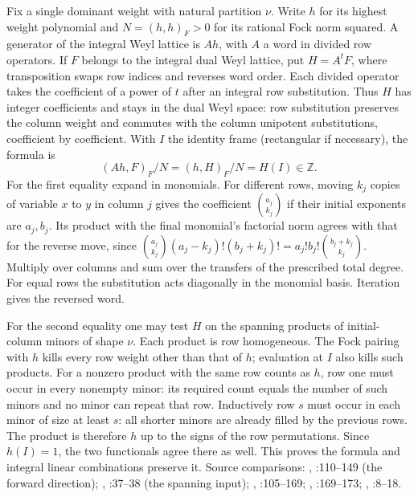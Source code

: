 Fix a single dominant weight with natural partition $\nu$. Write $h$ for its
highest weight polynomial and $N=(h,h)_F>0$ for its rational Fock norm
squared. A generator of the integral Weyl lattice is $Ah$, with $A$ a word
in divided row operators. If $F$ belongs to the integral dual Weyl lattice,
put $H=A^t F$, where transposition swaps row indices and reverses word order.
Each divided operator takes the coefficient of a power of $t$ after an
integral row substitution. Thus $H$ has integer coefficients and stays
in the dual Weyl space: row substitution preserves the column weight and
commutes with the column unipotent substitutions, coefficient by coefficient.
With $I$ the identity frame (rectangular if necessary), the formula is
\[
             (Ah,F)_F/N=(h,H)_F/N=H(I)\in\mathbb Z.
\]
For the first equality expand in monomials. For different rows, moving
$k_j$ copies of variable $x$ to $y$ in column $j$ gives the coefficient
$\binom{a_j}{k_j}$ if their initial exponents are $a_j,b_j$.
Its product with the final monomial's factorial norm agrees with that
for the reverse move, since
$\binom{a_j}{k_j}(a_j-k_j)!(b_j+k_j)!
= a_j!b_j!\binom{b_j+k_j}{k_j}$.
Multiply over columns and sum over the transfers of the prescribed total
degree. For equal rows the substitution acts diagonally in the monomial
basis. Iteration gives the reversed word.

For the second equality one may test $H$ on the spanning products of
initial-column minors of shape $\nu$. Each product is row homogeneous.
The Fock pairing with $h$ kills every row weight other than that of $h$;
evaluation at $I$ also kills such products. For a nonzero product with
the same row counts as $h$, row one must occur in every nonempty minor:
its required count equals the number of such minors and no minor can
repeat that row. Inductively row $s$ must occur in each minor of size
at least $s$: all shorter minors are already filled by the previous rows.
The product is therefore $h$ up to the signs of the row permutations.
Since $h(I)=1$, the two functionals agree there as well. This proves
the formula and integral linear combinations preserve it.
Source comparisons: ,
:110--149 (the forward direction);
, :37--38 (the
spanning input); ,
:105--169; ,
:169--173; ,
:8--18.

